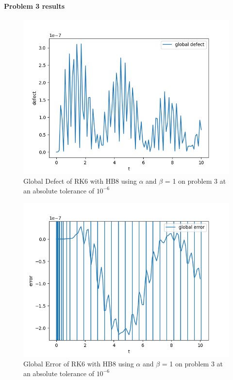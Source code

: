 \documentclass{article}
\begin{document}
\paragraph{Problem 3 results}


\begin{figure}[H]
\centering
\includegraphics[width=0.7\linewidth]{./figures/static_alpha_rk4_with_hb6_p3_global_defect}
\caption{Global Defect of RK6 with HB8 using $\alpha$ and $\beta$ = 1 on problem 3 at an absolute tolerance of $10^{-6}$}
\label{fig:static_alpha_rk6_with_hb8_p3_global_defect}
\end{figure}

\begin{figure}[H]
\centering
\includegraphics[width=0.7\linewidth]{./figures/static_alpha_rk6_with_hb8_p3_global_error}
\caption{Global Error of RK6 with HB8 using $\alpha$ and $\beta$ = 1 on problem 3 at an absolute tolerance of $10^{-6}$}
\label{fig:static_alpha_rk6_with_hb8_p3_global_error}
\end{figure}
\end{document}
